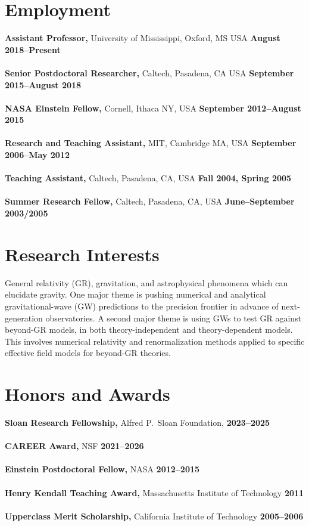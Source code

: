 \documentclass[margin,line]{res}
\begin{document}
\begin{resume}
\section{\sc Employment}
{\bf Assistant Professor,} University of Mississippi, Oxford, MS USA
\hfill {\bf August 2018--Present}\\
\\
{\bf Senior Postdoctoral Researcher,} Caltech, Pasadena, CA USA
\hfill {\bf September 2015--August 2018}\\
\\
{\bf NASA Einstein Fellow,} Cornell, Ithaca NY, USA
\hfill {\bf September 2012--August 2015}\\
\\
{\bf Research and Teaching Assistant,} MIT, Cambridge MA, USA \hfill {\bf September 2006--May 2012}\\
\\
{\bf Teaching Assistant,} Caltech, Pasadena, CA, USA \hfill {\bf  Fall 2004, Spring 2005}\\
\\
{\bf Summer Research Fellow,} Caltech, Pasadena, CA, USA \hfill {\bf  June--September 2003/2005}\\

\vspace{-1em}

\section{\sc Research Interests}
General relativity (GR), gravitation, and astrophysical phenomena which can
elucidate gravity.
One major theme is pushing numerical and analytical gravitational-wave
(GW) predictions to the precision frontier in advance of
next-generation observatories.
A second major theme is using GWs to test GR against beyond-GR
models, in both theory-independent and theory-dependent models.
This involves numerical relativity and renormalization methods
applied to specific effective field models for beyond-GR theories.

\section{\sc Honors and Awards}
{\bf Sloan Research Fellowship,}
Alfred P.\ Sloan Foundation,
\hfill {\bf 2023--2025}\\
\\
{\bf CAREER Award,} NSF \hfill {\bf 2021--2026}\\
\\
{\bf Einstein Postdoctoral Fellow,} NASA \hfill {\bf 2012--2015}\\
\\
{\bf Henry Kendall Teaching Award,} Massachusetts Institute of Technology \hfill {\bf 2011}\\
\\
{\bf Upperclass Merit Scholarship,} California Institute of Technology \hfill {\bf 2005--2006}\\


\end{resume}
\end{document}
